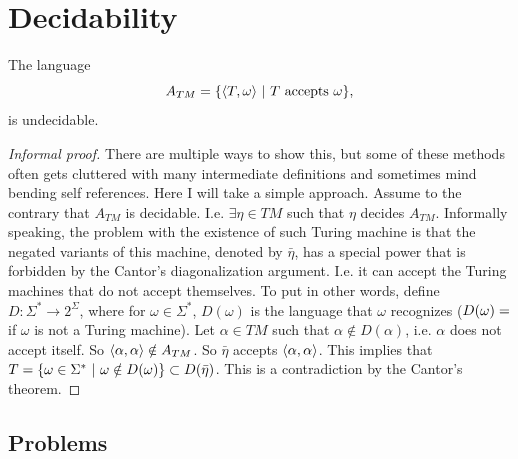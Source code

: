 \chapter{Decidability}


\begin{theorem}
	The language
	\[ A_{TM} = \{\langle T,\omega\rangle\ |\ \text{$ T $ accepts $ \omega $}\}, \]
	is undecidable.
\end{theorem}
\begin{proof}[Informal proof]
	There are multiple ways to show this, but some of these methods often gets cluttered with many intermediate definitions and sometimes mind bending self references. Here I will take a simple approach. Assume to the contrary that $ A_{TM} $ is decidable. I.e. $ \exists \eta \in TM $ such that $ \eta $ decides $ A_{TM} $. Informally speaking, the problem with the existence of such Turing machine is that the negated variants of this machine, denoted by $ \bar{\eta} $, has a special power that is forbidden by the Cantor's diagonalization argument. I.e. it can accept the Turing machines that do not accept themselves. To put in other words, define $ D: \Sigma^* \to 2^\Sigma $, where for $ \omega\in \Sigma^* $, $ D(\omega) $ is the language that $ \omega $ recognizes ($ D(\omega)=\empty $ if $ \omega $ is not a Turing machine). Let $ \alpha \in TM $ such that $ \alpha \notin D(\alpha) $, i.e. $ \alpha $ does not accept itself. So $ \langle\alpha,\alpha\rangle \notin A_{TM} $. So $ \bar{\eta} $ accepts $ \langle\alpha,\alpha\rangle $. This implies that $ T = \set{\omega\in\Sigma^*\ |\ \omega\notin D(\omega)} \subset D(\bar{\eta}) $. This is a contradiction by the Cantor's theorem.
\end{proof}

\section{Problems}


